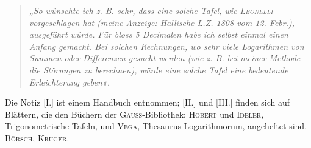 \begin{quotation}\itshape
„So wünschte ich z. B. sehr, dass eine solche Tafel, wie \textup{\textsc{Leonelli}}
vorgeschlagen hat (meine Anzeige: Hallische L.Z. 1808 vom 12. Febr.), ausgeführt würde.
Für bloss 5 Decimalen habe ich selbst einmal einen Anfang gemacht. Bei solchen
Rechnungen, wo sehr viele Logarithmen von Summen oder Differenzen gesucht
werden (wie z. B. bei meiner Methode die Störungen zu berechnen), würde eine
solche Tafel eine bedeutende Erleichterung geben«.
\end{quotation}

Die Notiz [I.] ist einem Handbuch entnommen; [II.] und [III.] finden sich auf Blättern,
die den Büchern der \textsc{Gauss}-Bibliothek: \textsc{Hobert} und \textsc{Ideler},
Trigonometrische Tafeln, und \textsc{Vega}, Thesaurus Logarithmorum, angeheftet sind.
\hfill \textsc{Börsch, Krüger}.
